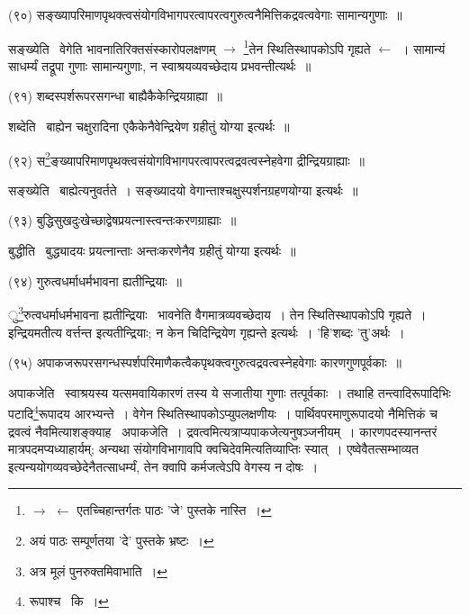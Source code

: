 \documentclass[11pt, openany]{book}
\begin{document}
{\newpage
\begin{sloppypar}
\hangindent=2cm {\knu (९०) सङ्ख्यापरिमाणपृथक्त्वसंयोगविभागपरत्वापरत्वगुरुत्वनैमित्तिकद्रवत्ववेगाः सामान्यगुणाः~॥}
\end{sloppypar}

{\knu सङ्ख्येति} \textendash\ वेगेति भावनातिरिक्तसंस्कारोपलक्षणम् $\rightarrow$ \renewcommand{\thefootnote}{1}\footnote{$\rightarrow$ $\leftarrow$ एतच्चिहान्तर्गतः पाठः 'जे' पुस्तके नास्ति~।}तेन स्थितिस्थापकोऽपि गृह्यते $\leftarrow$~। सामान्यं साधर्म्यं तद्रूपा गुणाः सामान्यगुणाः, न स्वाश्रयव्यवच्छेदाय प्रभवन्तीत्यर्थः~॥

\hangindent=2cm {\knu (९१) शब्दस्पर्शरूपरसगन्धा बाह्यैकैकेन्द्रियग्राह्या~॥}

{\knu शब्देति} \textendash\ बाह्येन चक्षुरादिना एकैकेनैवेन्द्रियेण ग्रहीतुं योग्या इत्यर्थः~॥

\hangindent=2cm {\knu (९२) स\renewcommand{\thefootnote}{2}\footnote{अयं पाठः सम्पूर्णतया 'दे' पुस्तके भ्रष्टः~।}ङ्ख्यापरिमाणपृथक्त्वसंयोगविभागपरत्वापरत्वद्रवत्वस्नेहवेगा द्रीन्द्रियग्राह्याः~॥}

{\knu सङ्ख्येति} \textendash\ बाह्येत्यनुवर्तते~। सङ्ख्यादयो वेगान्ताश्चक्षुस्पर्शनग्रहणयोग्या इत्यर्थः~॥

\hangindent=2cm {\knu (९३) बुद्धिसुखदुःखेच्छाद्वेषप्रयत्नास्त्वन्तःकरणग्राह्याः~॥}

{\knu बुद्धीति} \textendash\ बुद्ध्यादयः प्रयत्नान्ताः अन्तःकरणेनैव ग्रहीतुं योग्या इत्यर्थः~॥

\hangindent=2cm {\knu (९४) गुरुत्वधर्माधर्मभावना ह्यतीन्द्रियाः~॥}

{\knu ु\renewcommand{\thefootnote}{3}\footnote{अत्र मूलं पुनरुक्तमिवाभाति~।}रुत्वधर्माधर्मभावना ह्यतीन्द्रियाः} \textendash\ भावनेति वैगमात्रव्यवच्छेदाय~। तेन स्थितिस्थापकोऽपि गृह्यते~। इन्द्रियमतीत्य वर्त्तन्त इत्यतीन्द्रियाः; न केन चिदिन्द्रियेण गृह्यन्ते इत्यर्थः~। 'हि'शब्दः 'तु'अर्थः~।

\hangindent=2cm {\knu (९५) अपाकजरूपरसगन्धस्पर्शपरिमाणैकत्वैकपृथक्त्वगुरुत्वद्रवत्वस्नेहवेगाः कारणगुणपूर्वकाः~॥}

{\knu अपाकजेति} \textendash\ स्वाश्रयस्य यत्समवायिकारणं तस्य ये सजातीया गुणाः तत्पूर्वकाः~। तथाहि तन्त्वादिरूपादिभिः पटादि\renewcommand{\thefootnote}{4}\footnote{रूपाश्च \textendash\ कि~।}रूपादय आरभ्यन्ते~। वेगेन स्थितिस्थापकोऽप्युपलक्षणीयः~। पार्थिवपरमाणुरूपादयो नैमित्तिकं च द्रवत्वं नैवमित्याशङ्क्याह \textendash\ {\knu अपाकजेति~।} द्रवत्वमित्यत्राप्यपाकजेत्यनुषञ्जनीयम्~। कारणपदस्यानन्तरं मात्रपदमप्यध्याहार्यम्; अन्यथा संयोगविभागावपि क्वचिदेवमित्यतिव्याप्तिः स्यात्~। एष्वेवैतत्सम्भाव्यत इत्यन्ययोगव्यवच्छेदेनैतत्साधर्म्यं, तेन क्वापि कर्मजत्वेऽपि वेगस्य न दोषः~।

}
\end{document}

